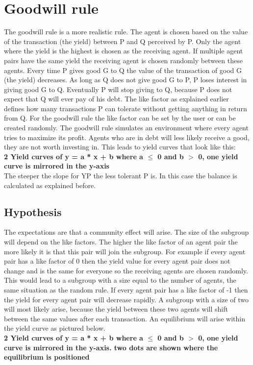 \documentclass[twoside,openright]{uva-bachelor-thesis}
\begin{document}
\section{Goodwill rule}
The goodwill rule is a more realistic rule. The agent is chosen based on the value of the transaction (the yield) between P and Q perceived by P. Only the agent where the yield is the highest is chosen as the receiving agent. If multiple agent pairs have the same yield the receiving agent is chosen randomly between these agents. Every time P gives good G to Q the value of the transaction of good G (the yield) decreases. As long as Q does not give good G to P, P loses interest in giving good G to Q. Eventually P will stop giving to Q, because P does not expect that Q will ever pay of his debt. The like factor as explained earlier defines how many transactions P can tolerate without getting anything in return from Q. For the goodwill rule the like factor can be set by the user or can be created randomly. The goodwill rule simulates an environment where every agent tries to maximize its profit. Agents who are in debt will less likely receive a good, they are not worth investing in.
This leads to yield curves that look like this: \\
\textbf{2 Yield curves of y = a * x + b where a $\le$ 0 and b $>$ 0, one yield curve is mirrored in the y-axis}\\
The steeper the slope for YP the less tolerant P is. In this case the balance is calculated as explained before.


\subsection{Hypothesis}
The expectations are that a community effect will arise. The size of the subgroup will depend on the like factors. The higher the like factor of an agent pair the more likely it is that this pair will join the subgroup. For example if every agent pair has a like factor of 0 then the yield value for every agent pair does not change and is the same for everyone so the receiving agents are chosen randomly. This would lead to a subgroup with a size equal to the number of agents, the same situation as the random rule. If every agent pair has a like factor of -1 then the yield for every agent pair will decrease rapidly. A subgroup with a size of two will most likely arise, because the yield between these two agents will shift between the same values after each transaction. An equilibrium will arise within the yield curve as pictured below. \\
\textbf{2 Yield curves of y = a * x + b where a $\le$ 0 and b $>$ 0, one yield curve is mirrored in the y-axis. two dots are shown where the equilibrium is positioned}
\end{document}
